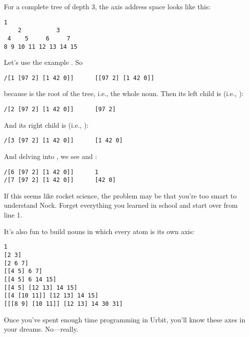 For a complete tree of depth 3, the axis address space looks
like this:

\begin{framed_shaded}
\begin{Verbatim}[fontsize=\relsize{-2.5},fontseries=b,commandchars=\\\{\}]
         1
    2          3
 4    5     6     7
8 9 10 11 12 13 14 15
\end{Verbatim}
\end{framed_shaded}
Let's use the example \kode{[[97 2] [1 42 0]]}.  So

\begin{framed_shaded}
\begin{Verbatim}[fontsize=\relsize{-2.5},fontseries=b,commandchars=\\\{\}]
/[1 [97 2] [1 42 0]]      [[97 2] [1 42 0]]
\end{Verbatim}
\end{framed_shaded}
because  is the root of the tree, i.e., the whole noun.  Then
its left child is  (i.e., ):

\begin{framed_shaded}
\begin{Verbatim}[fontsize=\relsize{-2.5},fontseries=b,commandchars=\\\{\}]
/[2 [97 2] [1 42 0]]      [97 2]
\end{Verbatim}
\end{framed_shaded}
And its right child is  (i.e., ):

\begin{framed_shaded}
\begin{Verbatim}[fontsize=\relsize{-2.5},fontseries=b,commandchars=\\\{\}]
/[3 [97 2] [1 42 0]]      [1 42 0]
\end{Verbatim}
\end{framed_shaded}
And delving into , we see  and :

\begin{framed_shaded}
\begin{Verbatim}[fontsize=\relsize{-2.5},fontseries=b,commandchars=\\\{\}]
/[6 [97 2] [1 42 0]]      1
/[7 [97 2] [1 42 0]]      [42 0]
\end{Verbatim}
\end{framed_shaded}
If this seems like rocket science, the problem may be that you're
too smart to understand Nock.  Forget everything you learned in
school and start over from line 1.

It's also fun to build nouns in which every atom is its own axis:

\begin{framed_shaded}
\begin{Verbatim}[fontsize=\relsize{-2.5},fontseries=b,commandchars=\\\{\}]
1
[2 3]
[2 6 7]
[[4 5] 6 7]
[[4 5] 6 14 15]
[[4 5] [12 13] 14 15]
[[4 [10 11]] [12 13] 14 15]
[[[8 9] [10 11]] [12 13] 14 30 31]
\end{Verbatim}
\end{framed_shaded}
Once you've spent enough time programming in Urbit, you'll know
these axes in your dreams.  No---really. 